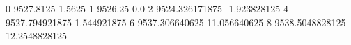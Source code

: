 0 9527.8125 1.5625
1 9526.25 0.0
2 9524.326171875 -1.923828125
4 9527.794921875 1.544921875
6 9537.306640625 11.056640625
8 9538.5048828125 12.2548828125
